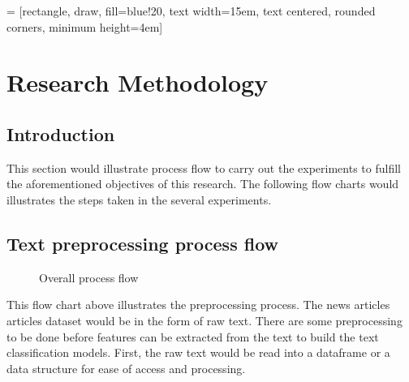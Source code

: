 
 = [rectangle, draw, fill=blue!20, 
text width=15em, text centered, rounded corners, minimum height=4em]


\chapter{Research Methodology}
\section{Introduction}
This section would illustrate process flow to carry out the experiments to fulfill the aforementioned objectives of this research. The following flow charts would illustrates the steps taken in the several experiments.

\section{Text preprocessing process flow}
\begin{figure}
\centering
{}
\caption{Overall process flow}
\label{fig: overallProcess}
\end{figure}

This flow chart above illustrates the preprocessing process. The news articles articles dataset would be in the form of raw text. There are some preprocessing to be done before features can be extracted from the text to build the text classification models. First, the raw text would be read into a dataframe or a data structure for ease of access and processing.

